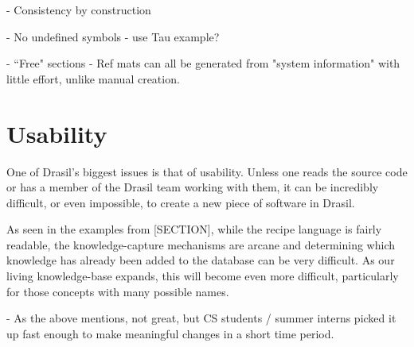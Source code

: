 - Consistency by construction

- No undefined symbols - use Tau example?

- ``Free" sections - Ref mats can all be generated from "system information" 
with little effort, unlike manual creation.
	
\section{Usability}
One of Drasil's biggest issues is that of usability. Unless one reads the source
code or has a member of the Drasil team working with them, it can be incredibly
difficult, or even impossible, to create a new piece of software in Drasil.

As seen in the examples from [SECTION], while the recipe language is fairly
readable, the knowledge-capture mechanisms are arcane and determining which
knowledge has already been added to the database can be very difficult. As our
living knowledge-base expands, this will become even more difficult,
particularly for those concepts with many possible names.

  - As the above mentions, not great, but CS students / summer interns picked it 
    up fast enough to make meaningful changes in a short time period.
